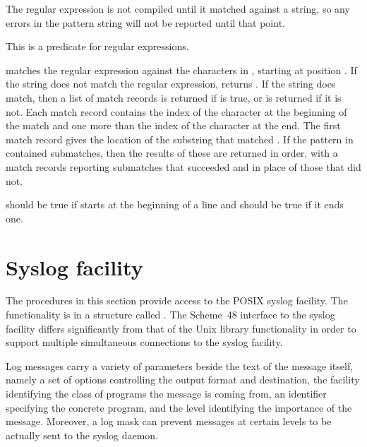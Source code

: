 The regular expression is not compiled until it matched against a string,
 so any errors in the pattern string will not be reported until that
 point.

\begin{protos}
\end{protos}
\noindent
This is a predicate for regular expressions.

\begin{protos}
\end{protos}
\noindent
{} matches the regular expression against the characters
 in , starting at position .
If the string does not match the regular expression, 
 returns .
If the string does match, then a list of match records is returned
 if  is true, or  is returned if it is not.
Each match record contains the index of the character at the beginning
 of the match and one more than the index of the character at the end.
The first match record gives the location of the substring that matched
 .
If the pattern in  contained submatches, then the results
 of these are returned in order, with a match records reporting submatches
 that succeeded and  in place of those that did not.

 should be true if  starts at the beginning
 of a line and  should be true if it ends one.

\section{Syslog facility}
\label{syslog-facility}

The procedures in this section provide access to the POSIX syslog
facility.  The functionality is in a structure called
.  The Scheme~48 interface to the
syslog facility differs significantly from that of the Unix library
functionality in order to support multiple simultaneous connections to
the syslog facility.

Log messages carry a variety of parameters beside the text of the
message itself, namely a set of options controlling the output format
and destination, the facility identifying the class of programs the
message is coming from, an identifier specifying the concrete program,
and the level identifying the importance of the message.  Moreover, a
log mask can prevent messages at certain levels to be actually sent to
the syslog daemon.


